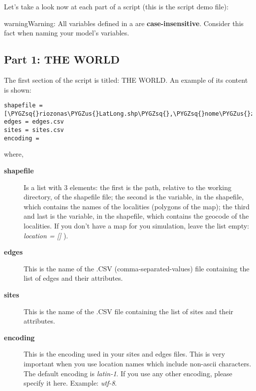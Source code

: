 \documentclass[a4paper,10pt,english]{sphinxmanual}
\def\PYGZus{\char`\_}
\def\PYGZsq{\char`\'}
\begin{document}
Let's take a look now at each part of a script (this is the script   demo file):

\begin{notice}{warning}{Warning:}
All variables defined in a  are \textbf{case-insensitive}. Consider this fact when naming your model's variables.
\end{notice}


\subsection{Part 1: THE WORLD}
\label{using:part-1-the-world}
The first section of the script is titled: THE WORLD. An example of its content is shown:

\begin{Verbatim}[commandchars=\\\{\}]
shapefile = [\PYGZsq{}riozonas\PYGZus{}LatLong.shp\PYGZsq{},\PYGZsq{}nome\PYGZus{}zonas\PYGZsq{},\PYGZsq{}zona\PYGZus{}trafe\PYGZsq{}]
edges = edges.csv
sites = sites.csv
encoding =
\end{Verbatim}

where,
\begin{description}
\item[{\textbf{shapefile}}] \leavevmode
Is a list with 3 elements: the first is  the path, relative to the working directory, of the shapefile file; the second  is the variable, in the shapefile, which contains the names of the localities (polygons of the map); the third and last is the variable, in the shapefile, which contains the geocode of the localities. If you don't have a map for you simulation, leave the list empty: \emph{location = {[}{]}} ).

\item[{\textbf{edges}}] \leavevmode
This is the name of the .CSV (comma-separated-values) file containing the list of edges and their attributes.

\item[{\textbf{sites}}] \leavevmode
This is the name of the .CSV file containing the list of sites and their attributes.

\item[{\textbf{encoding}}] \leavevmode
This is the encoding used in your sites and edges files. This is very important when you use location names which include non-ascii characters. The default encoding is \emph{latin-1}. If you use any other encoding, please specify it here. Example: \emph{utf-8}.

\end{description}
\end{document}
